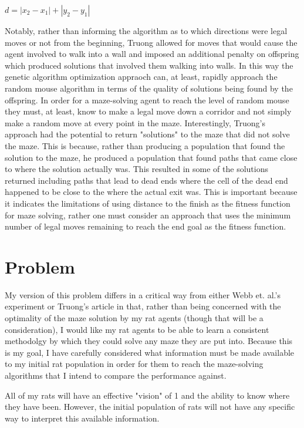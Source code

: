 \documentclass[12pt]{article}
\begin{document}
\begin{center}
$d = |x_2 - x_1| + |y_2 - y_1|$
\end{center}

Notably, rather than informing the algorithm as to which directions were legal moves or not from the beginning, Truong allowed for moves that would cause the agent involved to walk into a wall and imposed an additional penalty on offspring which produced solutions that involved them walking into walls. In this way the genetic algorithm optimization appraoch can, at least, rapidly approach the random mouse algorithm in terms of the quality of solutions being found by the offspring. In order for a maze-solving agent to reach the level of random mouse they must, at least, know to make a legal move down a corridor and not simply make a random move at every point in the maze. Interestingly, Truong's approach had the potential to return "solutions" to the maze that did not solve the maze. This is because, rather than producing a population that found the solution to the maze, he produced a population that found paths that came close to where the solution actually was. This resulted in some of the solutions returned including paths that lead to dead ends where the cell of the dead end happened to be close to the where the actual exit was. This is important because it indicates the limitations of using distance to the finish as the fitness function for maze solving, rather one must consider an approach that uses the minimum number of legal moves remaining to reach the end goal as the fitness function.

\section{Problem}

\hspace*{\parindent} My version of this problem differs in a critical way from either Webb et. al.'s experiment or Truong's article in that, rather than being concerned with the optimality of the maze solution by my rat agents (though that will be a consideration), I would like my rat agents to be able to learn a consistent methodolgy by which they could solve any maze they are put into. Because this is my goal, I have carefully considered what information must be made available to my initial rat population in order for them to reach the maze-solving algorithms that I intend to compare the performance against. 

All of my rats will have an effective "vision" of 1 and the ability to know where they have been. However, the initial population of rats will not have any specific way to interpret this available information. 
\end{document}
